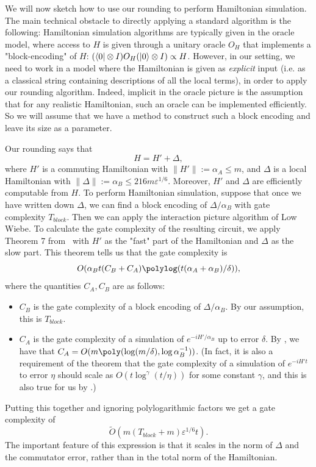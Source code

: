 \documentclass[a4paper,onecolumn,11pt]{quantumarticle}
\theoremstyle{plain}
\newcommand{\eps}{\varepsilon}
\begin{document}
We will now sketch how to use our rounding to perform Hamiltonian simulation. The main technical obstacle to directly applying a standard algorithm is the following: Hamiltonian simulation algorithms are typically given in the oracle model, where access to $H$ is given through a unitary oracle $O_H$ that implements a "block-encoding" of $H$: $(\bra{0}\otimes I)O_H (\ket{0} \otimes I) \propto H$. However, in our setting, we need to work in a model where the Hamiltonian is given as \emph{explicit} input (i.e. as a classical string containing descriptions of all the local terms), in order to apply our rounding algorithm. Indeed, implicit in the oracle picture is the assumption that for any realistic Hamiltonian, such an oracle can be implemented efficiently. So we will assume that we have a method to construct such a block encoding and leave its size as a parameter.

    Our rounding says that
    \[ H = H' + \Delta,\]
    where $H'$ is a commuting Hamiltonian with $\|H'\| := \alpha_A \leq m$, and $\Delta$ is a local Hamiltonian with $\|\Delta\| := \alpha_B  \leq 216 m \eps^{1/6}$. Moreover, $H'$ and $\Delta$ are efficiently computable from $H$. To perform Hamiltonian simulation, suppose that once we have written down $\Delta$, we can find a block encoding of $\Delta/\alpha_B$ with gate complexity $T_{block}$. Then we can apply the interaction picture algorithm of Low Wiebe. To calculate the gate complexity of the resulting circuit, we apply Theorem 7 from~\cite{low2018hamiltonian} with $H'$ as the "fast" part of the Hamiltonian and $\Delta$ as the slow part. 
    This theorem tells us that the gate complexity is
    \[O(\alpha_B t(C_B + C_A)\polylog(t(\alpha_A + \alpha_B)/\delta)),\]
    where the quantities $C_A, C_B$ are as follows:
    \begin{itemize}
        \item $C_B$ is the gate complexity of a block encoding of $\Delta/\alpha_B$. By our assumption, this is $T_{block}$. 
        \item $C_A$ is the gate complexity of a simulation of $e^{-iH'/\alpha_B}$ up to error $\delta$. By , we have that $C_A = O(m \poly(\log(m/\delta), \log \alpha_B^{-1}))$. (In fact, it is also a requirement of the theorem that the gate complexity of a simulation of $e^{-iH't}$ to error $\eta$ should scale as $O(t \log^{\gamma}(t/\eta))$ for some constant $\gamma$, and this is also true for us by .) 
    \end{itemize}
    Putting this together and ignoring polylogarithmic factors we get a gate complexity of 
    \[ \tilde{O}(m(T_{block} + m) \eps^{1/6} t).\]
    The important feature of this expression is that it scales in the norm of $\Delta$ and the commutator error, rather than in the total norm of the Hamiltonian.
\printbibliography

\appendix
\end{document}
